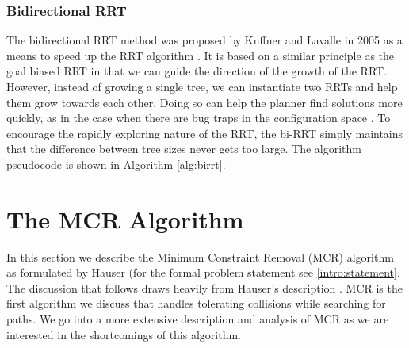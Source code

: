 \subsubsection{Bidirectional RRT} \label{planning:birrt}
The bidirectional RRT method was proposed by Kuffner and Lavalle in 2005 as a means to speed up the RRT algorithm \cite{lavalle:birrt}. It is based on a similar principle as the goal biased RRT in that we can guide the direction of the growth of the RRT. However, instead of growing a single tree, we can instantiate two RRTs and help them grow towards each other. Doing so can help the planner find solutions more quickly, as in the case when there are bug traps in the configuration space \cite{lavalle:planning}. To encourage the rapidly exploring nature of the RRT, the bi-RRT simply maintains that the difference between tree sizes never gets too large. The algorithm pseudocode is shown in Algorithm \ref{alg:birrt}.

{}

\section{The MCR Algorithm}
In this section we describe the Minimum Constraint Removal (MCR) algorithm as formulated by Hauser (for the formal problem statement see \ref{intro:statement}. The discussion that follows draws heavily from Hauser's description \cite{hauser:mcr}. MCR is the first algorithm we discuss that handles tolerating collisions while searching for paths. We go into a more extensive description and analysis of MCR as we are interested in the shortcomings of this algorithm.

